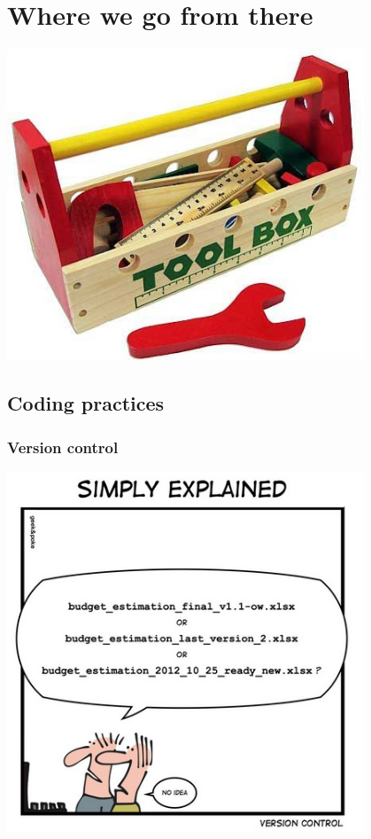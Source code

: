 \documentclass[14pt,notes]{beamer}
\begin{document}
\section{Where we go from there}
\begin{frame}
\centering
\includegraphics[width=0.8\textwidth]{wooden_tool_box}

\end{frame}

\subsection{Coding practices}
\begin{frame}
\frametitle{Version control}
\centering
\includegraphics[width=0.8\textwidth]{Version-Control-Comic}

\end{frame}
\end{document}
